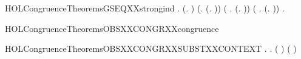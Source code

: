 \begin{SaveVerbatim}{HOLCongruenceTheoremsGSEQXXstrongind}
\HOLTokenTurnstile{} \HOLSymConst{\HOLTokenForall{}}.
        (\HOLTokenLambda{}. ) \HOLSymConst{\HOLTokenConj{}} (\HOLSymConst{\HOLTokenForall{}}.  (\HOLTokenLambda{}. )) \HOLSymConst{\HOLTokenConj{}}
       (\HOLSymConst{\HOLTokenForall{}} .   \HOLSymConst{\HOLTokenConj{}}   \HOLSymConst{\HOLTokenImp{}}  (\HOLTokenLambda{}.  )) \HOLSymConst{\HOLTokenConj{}}
       (\HOLSymConst{\HOLTokenForall{}}   .
              \HOLSymConst{\HOLTokenConj{}}   \HOLSymConst{\HOLTokenConj{}}   \HOLSymConst{\HOLTokenConj{}}   \HOLSymConst{\HOLTokenImp{}}
             (\HOLTokenLambda{}.   \HOLSymConst{\ensuremath{+}}  )) \HOLSymConst{\HOLTokenImp{}}
       \HOLSymConst{\HOLTokenForall{}}.   \HOLSymConst{\HOLTokenImp{}}  
\end{SaveVerbatim}
\newcommand{\HOLCongruenceTheoremsGSEQXXstrongind}{\UseVerbatim{HOLCongruenceTheoremsGSEQXXstrongind}}
\begin{SaveVerbatim}{HOLCongruenceTheoremsOBSXXCONGRXXcongruence}
\HOLTokenTurnstile{}  
\end{SaveVerbatim}
\newcommand{\HOLCongruenceTheoremsOBSXXCONGRXXcongruence}{\UseVerbatim{HOLCongruenceTheoremsOBSXXCONGRXXcongruence}}
\begin{SaveVerbatim}{HOLCongruenceTheoremsOBSXXCONGRXXSUBSTXXCONTEXT}
\HOLTokenTurnstile{} \HOLSymConst{\HOLTokenForall{}} .    \HOLSymConst{\HOLTokenImp{}} \HOLSymConst{\HOLTokenForall{}}.   \HOLSymConst{\HOLTokenImp{}}  ( ) ( )
\end{SaveVerbatim}
